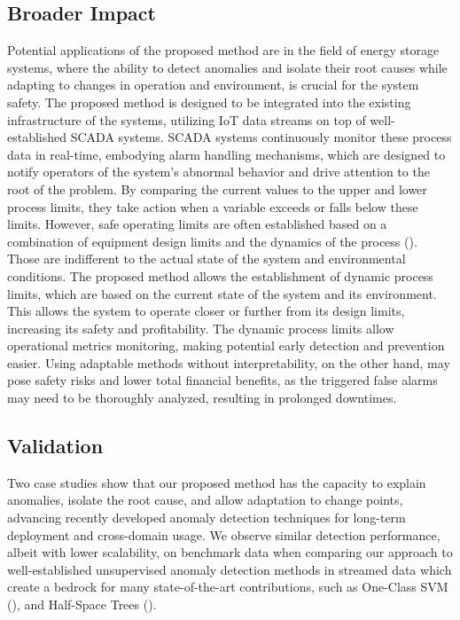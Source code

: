 \subsection{Broader Impact}
Potential applications of the proposed method are in the field of energy storage systems, where the ability to detect anomalies and isolate their root causes while adapting to changes in operation and environment, is crucial for the system safety. The proposed method is designed to be integrated into the existing infrastructure of the systems, utilizing IoT data streams on top of well-established SCADA systems. SCADA systems continuously monitor these process data in real-time, embodying alarm handling mechanisms, which are designed to notify operators of the system's abnormal behavior and drive attention to the root of the problem. By comparing the current values to the upper and lower process limits, they take action when a variable exceeds or falls below these limits. However, safe operating limits are often established based on a combination of equipment design limits and the dynamics of the process (\cite{Stauffer2021}). Those are indifferent to the actual state of the system and environmental conditions. The proposed method allows the establishment of dynamic process limits, which are based on the current state of the system and its environment. This allows the system to operate closer or further from its design limits, increasing its safety and profitability. The dynamic process limits allow operational metrics monitoring, making potential early detection and prevention easier. Using adaptable methods without interpretability, on the other hand, may pose safety risks and lower total financial benefits, as the triggered false alarms may need to be thoroughly analyzed, resulting in prolonged downtimes.

\subsection{Validation}\label{par:validation}
Two case studies show that our proposed method has the capacity to explain anomalies, isolate the root cause, and allow adaptation to change points, advancing recently developed anomaly detection techniques for long-term deployment and cross-domain usage. We observe similar detection performance, albeit with lower scalability, on benchmark data when comparing our approach to well-established unsupervised anomaly detection methods in streamed data which create a bedrock for many state-of-the-art contributions, such as One-Class SVM (\cite{Amer2013, Liu2014, Krawczyk2015, Miao2019, Gozuacik2021}), and Half-Space Trees (\cite{Wetzig2019, Lyu2020}).


